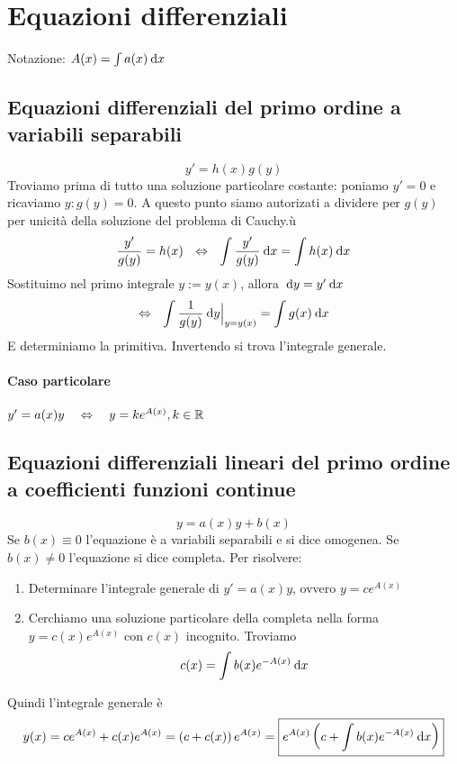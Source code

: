 \documentclass{article}
\begin{document}
\section*{Equazioni differenziali}
Notazione: $A(x)=\int a(x)\:\text{d} x$
\subsection*{Equazioni differenziali del primo ordine a variabili separabili}
\[y'=h(x)g(y)\tag{VS}\]
Troviamo prima di tutto una soluzione particolare costante: poniamo $y'=0$ e ricaviamo $y: g(y)=0$. A questo punto siamo autorizati a dividere per $g(y)$ per unicità della soluzione del problema di Cauchy.ù
\[\frac{y'}{g(y)}=h(x)~~\Leftrightarrow~~\int\frac{y'}{g(y)}\:\text{d} x=\int h(x)\:\text{d} x\]
Sostituimo nel primo integrale $y:=y(x)$, allora $\:\text{d} y = y'\:\text{d} x$
\[\Leftrightarrow ~~ \int \frac{1}{g(y)}\:\text{d} y\Big|_{y=y(x)}=\int g(x)\:\text{d} x\]
E determiniamo la primitiva. Invertendo si trova l'integrale generale.
\paragraph*{Caso particolare}\(y'=a(x)y~~~\Leftrightarrow~~~y=ke^{A(x)}, k\in \mathbb{R}\)
\subsection*{Equazioni differenziali lineari del primo ordine a coefficienti funzioni continue}
\[y=a(x)y+b(x)\tag{L1}\]
Se $b(x)\equiv 0$ l'equazione è a variabili separabili e si dice omogenea. Se $b(x)\neq 0$ l'equazione si dice completa.
Per risolvere:
\begin{enumerate}
    \item Determinare l'integrale generale di $y'=a(x)y$, ovvero $y=ce^{A(x)}$
    \item Cerchiamo una soluzione particolare della completa nella forma $y=c(x)e^{A(x)}$ con $c(x)$ incognito. Troviamo
        \[c(x)=\int b(x)e^{-A(x)}\:\text{d} x\]
\end{enumerate}
Quindi l'integrale generale è
\[y(x)=ce^{A(x)}+c(x)e^{A(x)}=\left( c+c(x) \right)e^{A(x)}=\boxed{e^{A(x)}\left( c+\int b(x)e^{-A(x)}\:\text{d} x \right)}\]
\end{document}
